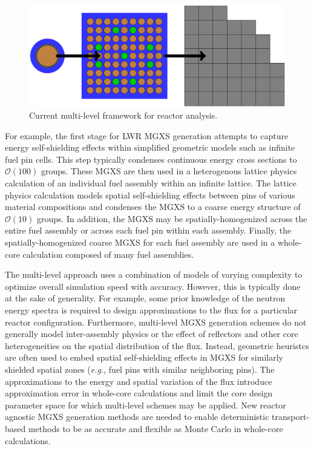 \begin{figure}
\centering
\includegraphics[width=0.9\linewidth]{figures/intro/multi-step-flow-chart}
\caption[Multi-level approach to reactor analysis]{Current multi-level framework for reactor analysis.}
\label{fig:chap1-multi-level-flow-chart}
\end{figure}

For example, the first stage for \ac{LWR} \ac{MGXS} generation attempts to capture energy self-shielding effects within simplified geometric models such as infinite fuel pin cells. This step typically condenses continuous energy cross sections to $\mathcal{O}(100)$ groups. These \ac{MGXS} are then used in a heterogenous lattice physics calculation of an individual fuel assembly within an infinite lattice. The lattice physics calculation models spatial self-shielding effects between pins of various material compositions and condenses the \ac{MGXS} to a coarse energy structure of $\mathcal{O}(10)$ groups. In addition, the \ac{MGXS} may be spatially-homogenized across the entire fuel assembly or across each fuel pin within each assembly. Finally, the spatially-homogenized coarse \ac{MGXS} for each fuel assembly are used in a whole-core calculation composed of many fuel assemblies.

The multi-level approach uses a combination of models of varying complexity to optimize overall simulation speed with accuracy. However, this is typically done at the sake of generality. For example, some prior knowledge of the neutron energy spectra is required to design approximations to the flux for a particular reactor configuration. Furthermore, multi-level \ac{MGXS} generation schemes do not generally model inter-assembly physics or the effect of reflectors and other core heterogeneities on the spatial distribution of the flux. Instead, geometric heuristcs are often used to embed spatial self-shielding effects in \ac{MGXS} for similarly shielded spatial zones (\textit{e.g.}, fuel pins with similar neighboring pins). The approximations to the energy and spatial variation of the flux introduce approximation error in whole-core calculations and limit the core design parameter space for which multi-level schemes may be applied. New reactor agnostic \ac{MGXS} generation methods are needed to enable deterministic transport-based methods to be as accurate and flexible as Monte Carlo in whole-core calculations.

